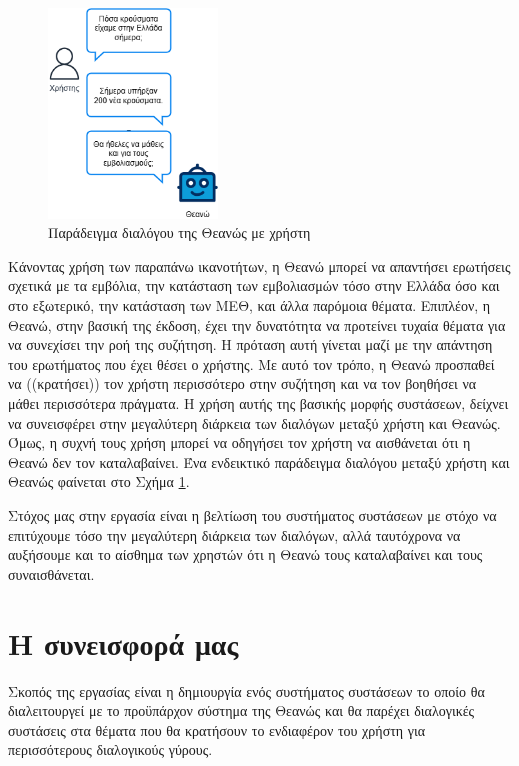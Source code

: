 \begin{figure}
    \centering
    \includegraphics[width=0.4\textwidth]{body_matter/introduction/images/theano_example.png}
    \caption{Παράδειγμα διαλόγου της Θεανώς με χρήστη}
    \label{fig:theano_dialogue}
\end{figure}

Κάνοντας χρήση των παραπάνω ικανοτήτων, η Θεανώ μπορεί να απαντήσει ερωτήσεις σχετικά με τα εμβόλια, την κατάσταση των εμβολιασμών
τόσο στην Ελλάδα όσο και στο εξωτερικό, την κατάσταση των ΜΕΘ, και άλλα παρόμοια θέματα. Επιπλέον, η Θεανώ, στην βασική της έκδοση,
έχει την δυνατότητα να προτείνει τυχαία θέματα για να συνεχίσει την ροή της συζήτηση. Η πρόταση αυτή γίνεται μαζί με την απάντηση του
ερωτήματος που έχει θέσει ο χρήστης. Με αυτό τον τρόπο, η Θεανώ προσπαθεί να ((κρατήσει)) τον χρήστη περισσότερο στην συζήτηση και να τον βοηθήσει
να μάθει περισσότερα πράγματα. Η χρήση αυτής της βασικής μορφής συστάσεων, δείχνει να συνεισφέρει στην μεγαλύτερη διάρκεια των διαλόγων μεταξύ
χρήστη και Θεανώς. Όμως, η συχνή τους χρήση μπορεί να οδηγήσει τον χρήστη να αισθάνεται ότι η Θεανώ δεν τον καταλαβαίνει. Ένα ενδεικτικό παράδειγμα διαλόγου μεταξύ χρήστη
και Θεανώς φαίνεται στο Σχήμα \ref{fig:theano_dialogue}.

Στόχος μας στην εργασία είναι η βελτίωση του συστήματος συστάσεων με στόχο να επιτύχουμε τόσο την μεγαλύτερη διάρκεια των διαλόγων, αλλά ταυτόχρονα
να αυξήσουμε και το αίσθημα των χρηστών ότι η Θεανώ τους καταλαβαίνει και τους συναισθάνεται.

\section{Η συνεισφορά μας}

Σκοπός της εργασίας είναι η δημιουργία ενός συστήματος συστάσεων το οποίο θα διαλειτουργεί με το προϋπάρχον σύστημα της Θεανώς και θα παρέχει διαλογικές
συστάσεις στα θέματα που θα κρατήσουν το ενδιαφέρον του χρήστη για περισσότερους διαλογικούς γύρους.


